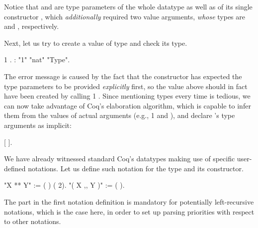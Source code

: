 Notice that  and  are type parameters of the whole datatype as
well as of its single constructor , which \textit{additionally}
required two value arguments, \textit{whose} types are  and ,
respectively. 


Next, let us try to create a value of type    and
check its type.  


\coqdoceol
\coqdocemptyline
\coqdocnoindent
{}  1 .\coqdoceol
\coqdocnoindent
\coqdoceol
\coqdocnoindent
{}:   "1"   "nat"        "Type".

\coqdocemptyline


The error message is caused by the fact that the constructor has
expected the type parameters to be provided \textit{explicitly} first, so the
value above should in fact have been created by calling  
 1 . Since mentioning types every time is tedious, we can now
take advantage of Coq's elaboration algorithm, which is capable to
infer them from the values of actual arguments (e.g., 1 and ),
and declare 's type arguments as implicit:
\begin{coqdoccode}
\coqdocemptyline
\coqdocnoindent
{}  [ ].\coqdoceol
\coqdocemptyline
\end{coqdoccode}


We have already witnessed standard Coq's datatypes making use of
specific user-defined notations. Let us define such notation for the
type  and its  constructor.
 \begin{coqdoccode}
\coqdocemptyline
\coqdocnoindent
{} "X ** Y" := (  ) (  2).\coqdoceol
\coqdocnoindent
{} "( X ,, Y )" := (  ).\coqdoceol
\coqdocemptyline
\end{coqdoccode}


The  part in the first notation definition is mandatory for
potentially left-recursive notations, which is the case here, in order
to set up parsing priorities with respect to other notations.


